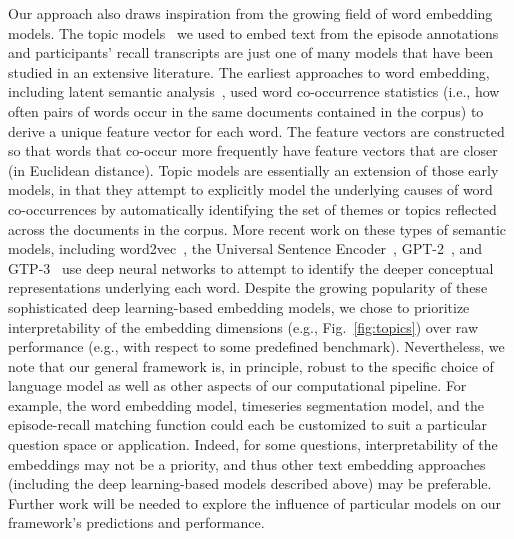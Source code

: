 \documentclass[10pt]{article}
\begin{document}
Our approach also draws inspiration from the growing field of word embedding models.  The topic models~\citep{BleiEtal03} we used to embed text from the episode annotations and participants' recall transcripts are just one of many models that have been studied in an extensive literature.  The earliest approaches to word embedding, including latent
semantic analysis~\citep{LandDuma97}, used word co-occurrence statistics (i.e., how often pairs of words occur in the same documents contained in the corpus) to derive a unique feature vector for each word.  The feature vectors are constructed so that words that co-occur more frequently have feature vectors that are closer (in Euclidean distance).  Topic models are essentially an extension of those early models, in that they attempt to explicitly model the underlying causes of word co-occurrences by automatically identifying the set of themes or topics reflected across the documents in the corpus.  More recent work on these types of semantic models, including word2vec~\citep{MikoEtal13a}, the Universal Sentence Encoder~\citep{CerEtal18}, GPT-2~\citep{RadfEtal19}, and GTP-3~\citep{BrowEtal20} use deep neural networks to attempt to identify the deeper conceptual representations underlying each word.  Despite the growing popularity of these sophisticated deep learning-based embedding models, we chose to prioritize interpretability of the embedding dimensions (e.g., Fig.~\ref{fig:topics}) over raw performance (e.g., with respect to some predefined benchmark).  Nevertheless, we note that our general framework is, in principle, robust to the specific choice of language model as well as other aspects of our computational pipeline.  For example, the word embedding model, timeseries segmentation model, and the episode-recall matching function could each be customized to suit a particular question space or application.  Indeed, for some questions, interpretability of the embeddings may not be a priority, and thus other text embedding approaches (including the deep learning-based models described above) may be preferable.  Further work will be needed to explore the influence of particular models on our framework's predictions and performance.
\end{document}
